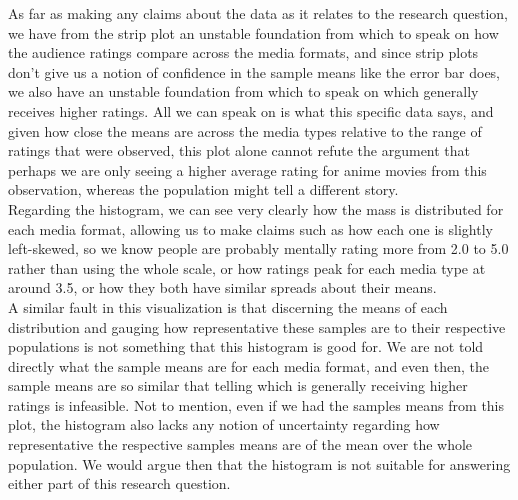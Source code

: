 As far as making any claims about the data as it relates to the research question, we have from the strip plot an unstable foundation from which to speak on how the audience ratings compare across the media formats, and since strip plots don't give us a notion of confidence in the sample means like the error bar does, we also have an unstable foundation from which to speak on which generally receives higher ratings. All we can speak on is what this specific data says, and given how close the means are across the media types relative to the range of ratings that were observed, this plot alone cannot refute the argument that perhaps we are only seeing a higher average rating for anime movies from this observation, whereas the population might tell a different story.\\

Regarding the histogram, we can see very clearly how the mass is distributed for each media format, allowing us to make claims such as how each one is slightly left-skewed, so we know people are probably mentally rating more from 2.0 to 5.0 rather than using the whole scale, or how ratings peak for each media type at around 3.5, or how they both have similar spreads about their means.\\

A similar fault in this visualization is that discerning the means of each distribution and gauging how representative these samples are to their respective populations is not something that this histogram is good for. We are not told directly what the sample means are for each media format, and even then, the sample means are so similar that telling which is generally receiving higher ratings is infeasible. Not to mention, even if we had the samples means from this plot, the histogram also lacks any notion of uncertainty regarding how representative the respective samples means are of the mean over the whole population. We would argue then that the histogram is not suitable for answering either part of this research question.\\
\newpage
